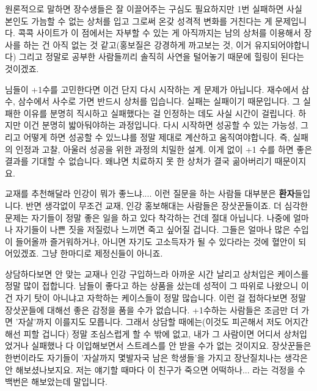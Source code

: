 원론적으로 말하면 장수생들은 잘 이끌어주는 구심도 필요하지만
1번 실패하면 사실 본인도 가늠할 수 없는 상처를 입고 그로써 온갖 성격적 변화를 거친다는 게 문제입니다.
콕콕 사이트가 이 점에서는 자부할 수 있는 게
아직까지는 남의 상처를 이용해서 장사를 하는 건 아직 없는 것 같고(홍보질은 강경하게 까고보는 것, 이거 유지되어야합니다)
그리고 정말로 공부한 사람들끼리 솔직히 사연을 털어놓기 때문에 힐링이 된다는 것이겠죠.
\vspace{5mm}

님들이 +1수를 고민한다면 이건 단지 다시 시작하는 게 문제가 아닙니다.
재수에서 삼수, 삼수에서 사수로 가면 반드시 상처를 입습니다. 실패는 실패이기 때문입니다.
그 실패한 이유를 분명히 직시하고 실패했다는 걸 인정하는 데도 사실 시간이 걸립니다. 하지만 이건 분명히 밟아둬야하는 과정입니다.
다시 시작하면 성공할 수 있는 가능성, 그리고 어떻게 하면 성공할 수 있느냐를 정말 제대로 계산하고 움직여야합니다.
즉, 실패의 인정과 고찰, 아울러 성공을 위한 과정의 치밀한 설계.
이게 없이 +1 수를 하면 좋은 결과를 기대할 수 없습니다. 왜냐면 치료하지 못 한 상처가 결국 곪아버리기 때문이지요.
\vspace{5mm}

교재를 추천해달라 인강이 뭐가 좋느냐.... 이런 질문을 하는 사람들 대부분은 \textbf{환자}들입니다.
반면 생각없이 무조건 교재, 인강 홍보해대는 사람들은 장삿꾼들이죠.
더 심각한 문제는 자기들이 정말 좋은 일을 하고 있다 착각하는 건데 절대 아닙니다.
나중에 얼마나 자기들이 나쁜 짓을 저질렀나 느끼면 죽고 싶어질 겁니다.
그들은 얼마나 많은 수입이 들어올까 즐거워하거나, 아니면 자기도 고소득자가 될 수 있다라는 것에 혈안이 되어있겠죠.
그냥 한마디로 제정신들이 아니죠.
\vspace{5mm}

상담하다보면 안 맞는 교재나 인강 구입하느라 아까운 시간 날리고 상처입은 케이스를 정말 많이 접합니다.
남들이 좋다고 하는 상품을 샀는데 성적이 그 따위로 나왔으니 이건 자기 탓이 아니냐고 자학하는 케이스들이 정말 많습니다.
이런 걸 접하다보면 정말 장삿꾼들에 대해선 좋은 감정을 품을 수가 없습니다.
+1수하는 사람들은 조금만 더 가면 '자살'까지 이를지도 모릅니다. 그래서 상담할 때에는(이것도 피곤해서 저도 어지간해선 피할 겁니다)
정말 조심스럽게 할 수 밖에 없고, 내가 그 사람이면 어디서 상처입었거나 실패했나 다 이입해보면서 스트레스를 안 받을 수가 없는 것이지요.
장삿꾼들은 한번이라도 자기들이 '자살까지 몇발자국 남은 학생들'을 가지고 장난질치나는 생각은 안 해보셨나보지요.
저는 얘기할 때마다 이 친구가 죽으면 어떡하나... 라는 걱정을 수백번은 해보았는데 말입니다.
\vspace{5mm}

